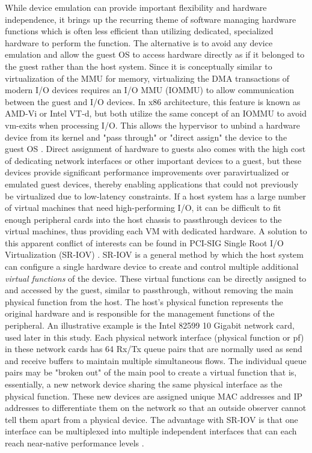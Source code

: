 While device emulation can provide important flexibility and hardware independence, it brings up the recurring theme of software managing hardware functions which is often less efficient than utilizing dedicated, specialized hardware to perform the function.
The alternative is to avoid any device emulation and allow the guest OS to access hardware directly as if it belonged to the guest rather than the host system.
Since it is conceptually similar to virtualization of the MMU for memory, virtualizing the DMA transactions of modern I/O devices requires an I/O MMU (IOMMU) to allow communication between the guest and I/O devices.
In x86 architecture, this feature is known as AMD-Vi or Intel VT-d, but both utilize the same concept of an IOMMU to avoid vm-exits when processing I/O.
This allows the hypervisor to unbind a hardware device from its kernel and "pass through" or "direct assign" the device to the guest OS \autocite{_jones_1}.
Direct assignment of hardware to guests also comes with the high cost of dedicating network interfaces or other important devices to a guest, but these devices provide significant performance improvements over paravirtualized or emulated guest devices, thereby enabling applications that could not previously be virtualized due to low-latency constraints.
If a host system has a large number of virtual machines that need high-performing I/O, it can be difficult to fit enough peripheral cards into the host chassis to passthrough devices to the virtual machines, thus providing each VM with dedicated hardware.
A solution to this apparent conflict of interests can be found in PCI-SIG Single Root I/O Virtualization (SR-IOV) \autocite{_pcisig_1, intelvtd}.
SR-IOV is a general method by which the host system can configure a single hardware device to create and control multiple additional \emph{virtual functions} of the device.
These virtual functions can be directly assigned to and accessed by the guest, similar to passthrough, without removing the main physical function from the host.
The host's physical function represents the original hardware and is responsible for the management functions of the peripheral.  
An illustrative example is the Intel 82599 10 Gigabit network card, used later in this study.
Each physical network interface (physical function or pf) in these network cards has 64 Rx/Tx queue pairs that are normally used as send and receive buffers to maintain multiple simultaneous flows.
The individual queue pairs may be "broken out" of the main pool to create a virtual function that is, essentially, a new network device sharing the same physical interface as the physical function.
These new devices are assigned unique MAC addresses and IP addresses to differentiate them on the network so that an outside observer cannot tell them apart from a physical device.
The advantage with SR-IOV is that one interface can be multiplexed into multiple independent interfaces that can each reach near-native performance levels \autocite{_nasa_1}.

